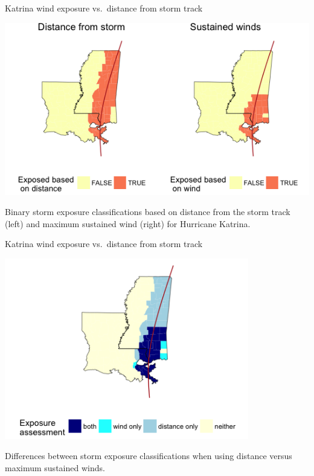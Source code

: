 \documentclass[ignorenonframetext,]{beamer}
\begin{document}
\begin{frame}{Katrina wind exposure vs.~distance from storm track}

\begin{center}\includegraphics[width=\textwidth]{figures/katrina_exposure_discrete} \end{center}

\footnotesize Binary storm exposure classifications based on distance
from the storm track (left) and maximum sustained wind (right) for
Hurricane Katrina.

\end{frame}

\begin{frame}{Katrina wind exposure vs.~distance from storm track}

\begin{center}\includegraphics[width=0.8\textwidth]{figures/katrina_exposure_class} \end{center}

\footnotesize Differences between storm exposure classifications when
using distance versus maximum sustained winds.

\end{frame}
\end{document}
